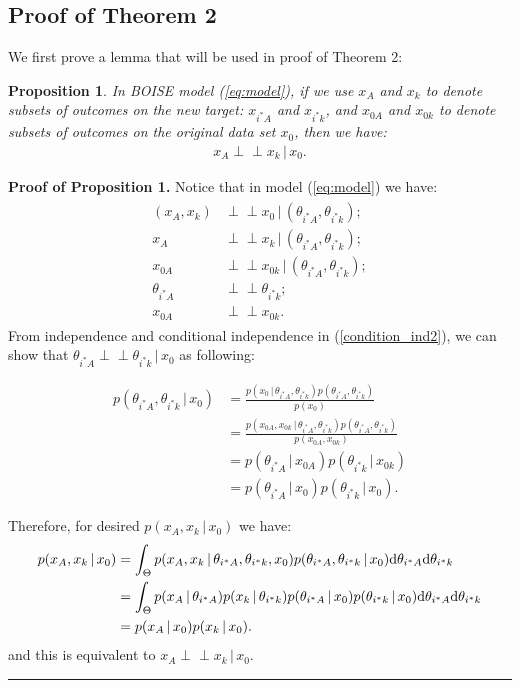 \documentclass[12pt]{article}
\newtheorem{proposition}{Proposition}
\newenvironment{proof}[1][Proof]{\noindent\textbf{#1.} }{\ \rule{0.5em}{0.5em}}
\newcommand{\indep}{\perp \!\!\! \perp}
\begin{document}
\subsection{Proof of Theorem 2}
We first prove a lemma that will be used in proof of Theorem 2:
\begin{proposition}
In BOISE model (\ref{eq:model}), if we use $x_A$ and $x_k$ to denote subsets of outcomes on the new target: $x_{i^*A}$ and $x_{i^*k}$, and $x_{0A}$ and $x_{0k}$ to denote subsets of outcomes on the original data set $x_0$, then we have:
\begin{eqnarray}
\label{condition_ind}
x_A \indep x_k \, | \, x_0.
\end{eqnarray}
\end{proposition}

\begin{proof}[Proof of Proposition 1]
Notice that in model (\ref{eq:model}) we have:
\begin{align}
\label{condition_ind2}
\begin{split}
    (x_A,x_k) &\indep x_0 \, | \, (\theta_{i^*A},\theta_{i^*k});\\
x_A &\indep x_k \,|\, (\theta_{i^*A},\theta_{i^*k});\\
x_{0A} &\indep x_{0k} \,|\, (\theta_{i^*A},\theta_{i^*k});\\
\theta_{i^*A} &\indep \theta_{i^*k};\\
x_{0A} &\indep x_{0k}.
\end{split}
\end{align}
From independence and conditional independence in (\ref{condition_ind2}), we can show that $\theta_{i^*A}\indep \theta_{i^*k}\, | \, x_0$ as following:

\begin{align*}
    p(\theta_{i^*A},\theta_{i^*k}\,|\,x_0)&=
    \frac{p(x_0\,|\,\theta_{i^*A},\theta_{i^*k})p(\theta_{i^*A},\theta_{i^*k})}{p(x_0)}\\
    &= \frac{p(x_{0A},x_{0k}\,|\,\theta_{i^*A},\theta_{i^*k})p(\theta_{i^*A},\theta_{i^*k})}{p(x_{0A},x_{0k})}\\
    &= p(\theta_{i^*A}\,|\,x_{0A})p(\theta_{i^*k}\,|\,x_{0k})\\
    &= p(\theta_{i^*A}\,|\,x_0)p(\theta_{i^*k}\,|\,x_0).
\end{align*}

Therefore, for desired $p(x_A,x_k\,|\,x_0)$ we have:
\begin{align}
\begin{split}
    p(x_A,x_k\,|\,x_0) &= \int_\Theta p(x_A,x_k\,|\,\theta_{i^*A},\theta_{i^*k},x_0)p(\theta_{i^*A},\theta_{i^*k}\,|\,x_0) {\rm d}\theta_{i^*A}{\rm d}\theta_{i^*k}\\
    &= \int_\Theta p(x_A\,|\,\theta_{i^*A})p(x_k\,|\,\theta_{i^*k})p(\theta_{i^*A}\,|\,x_0)p(\theta_{i^*k}\,|\,x_0){\rm d}\theta_{i^*A}{\rm d}\theta_{i^*k}\\
    &= p(x_A\,|\,x_0)p(x_k\,|\,x_0).
\end{split}
\end{align}
and this is equivalent to $x_A \indep x_k \, | \, x_0$.
\end{proof}
\end{document}

